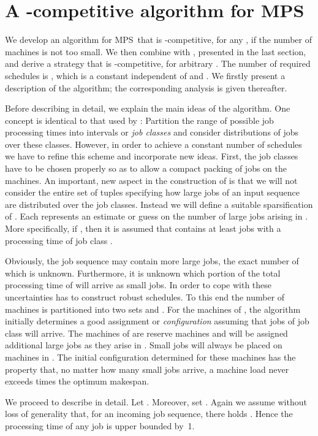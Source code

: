 \documentclass{llncs}
\newcommand{\MPSO}{{\rm MPS}}
\begin{document}
\section{A {}-competitive algorithm for \MPSO}\label{sec:4/3}

We develop an algorithm   for \MPSO\ that is -competitive, for any , if
the number  of machines is not too small. We then combine  with ,
presented in the last section, and derive a strategy  that is -competitive,
for arbitrary . The number of required schedules is , which is a constant independent of
 and . We firstly present a description of the algorithm; the corresponding analysis is given thereafter.

Before describing  in detail, we explain the main ideas of the algorithm. One concept
is identical to that used by : Partition the range of possible job processing times into
intervals or {\em job classes\/} and consider distributions of jobs over these classes. However, in order
to achieve a constant number of schedules we have to refine this scheme and incorporate new
ideas. First, the job classes have to be chosen properly so as to allow a compact packing of jobs on the machines.
An important, new aspect in the construction of  is that we will not consider 
the entire set  of tuples specifying how large jobs of an input sequence~ are distributed over 
the job classes. Instead we will define a suitable sparsification  of . Each  represents 
an estimate or guess on the number of large jobs arising in . More specifically, if 
, then it is assumed that  contains at least  jobs with a processing
time of job class . 

Obviously, the job sequence  may contain more large jobs, the exact number of which is unknown. 
Furthermore, it is unknown which portion of the total processing time of  will arrive as small 
jobs. In order to cope with these uncertainties  has to construct robust schedules. 
To this end the number of machines is partitioned into two sets  and
. For the machines of , the algorithm initially determines a good assignment or
{\em configuration\/} assuming that  jobs of job class  will arrive. The machines of 
are reserve machines and will be assigned additional large jobs as they arise in . Small jobs
will always be placed on machines in . The initial configuration determined for these 
machines has the property that, no matter how many small jobs arrive, a machine load never exceeds 
times the optimum makespan.

We proceed to describe  in detail. Let . Moreover, set .
Again we assume without loss of generality that, for an incoming job sequence, there holds . 
Hence the processing time of any job is upper bounded by~1. 
\end{document}
